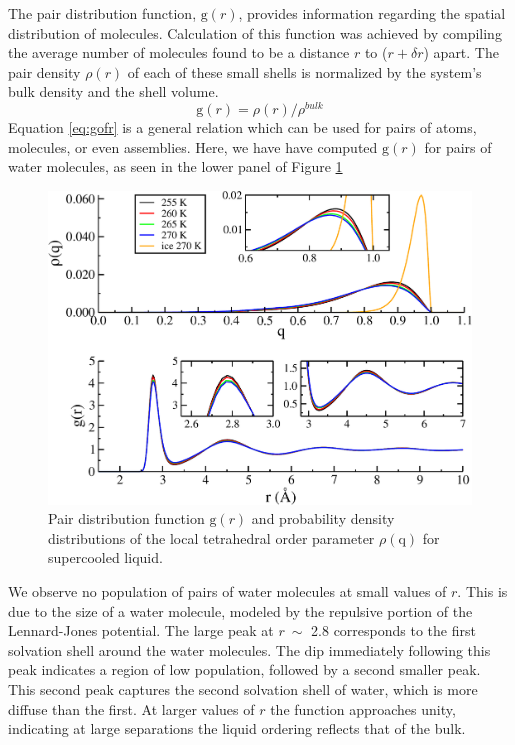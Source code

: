 The pair distribution function, $\mathrm{g}(r)$, provides information
regarding the spatial distribution of molecules. Calculation of this
function was achieved by compiling the average number of molecules
found to be a distance $r$ to ($r + \delta r$) apart. The
pair density $\rho (r)$ of each of these small shells is normalized by
the system's bulk density and the shell volume.
\begin{equation}\label{eq:gofr}
\mathrm{g}(r) = \rho(r) / \rho^{bulk}
\end{equation}
Equation \eqref{eq:gofr} is a general relation which can be used for
pairs of atoms, molecules, or even assemblies. Here, we have have
computed $\mathrm{g}(r)$ for pairs of water molecules, as
seen in the lower panel of Figure \ref{fig:gofrQ}

\begin{figure}
\includegraphics[width=\linewidth]{Figures/bulk_GofrQdens}
\caption{\label{fig:gofrQ} Pair distribution function
  $\mathrm{g}(r)$ and probability density distributions of
  the local tetrahedral order parameter $\rho (\mathrm{q})$ for
  supercooled liquid.}
\end{figure}  

We observe no population of pairs of water molecules at small values
of $r$. This is due to the size of a water molecule, modeled
by the repulsive portion of the Lennard-Jones potential. The large
peak at $r~\sim$ 2.8 corresponds to the first solvation
shell around the water molecules. The dip immediately following this
peak indicates a region of low population, followed by a second
smaller peak. This second peak captures the second solvation shell of
water, which is more diffuse than the first. At larger values of
$r$ the function approaches unity, indicating at large
separations the liquid ordering reflects that of the bulk. 

